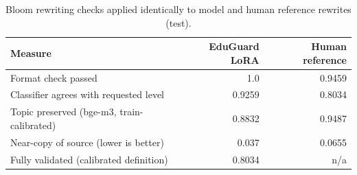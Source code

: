 \begin{table}[t]
\centering
\caption{Bloom rewriting checks applied identically to model and human reference rewrites (test).}
\label{tab:t7_bloom_model_vs_reference}
\begin{tabular}{lrr}
\toprule
Measure & EduGuard LoRA & Human reference \\
\midrule
Format check passed & 1.0 & 0.9459 \\
Classifier agrees with requested level & 0.9259 & 0.8034 \\
Topic preserved (bge-m3, train-calibrated) & 0.8832 & 0.9487 \\
Near-copy of source (lower is better) & 0.037 & 0.0655 \\
Fully validated (calibrated definition) & 0.8034 & n/a \\
\bottomrule
\end{tabular}
\end{table}
